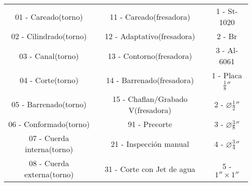 		\begin{center}
			\begin{tabular}{|c|c|c|}
				01 - Careado(torno)        & 11 - Careado(fresadora)           & 1 - St-1020\\
				02 - Cilindrado(torno)     & 12 - Adaptativo(fresadora)        & 2 - Br \\
				03 - Canal(torno)          & 13 - Contorno(fresadora)          & 3 - Al-6061\\
				04 - Corte(torno)          & 14 - Barrenado(fresadora)         & 1 - Placa $\frac{1}{8}''$ \\
				05 - Barrenado(torno)      & 15 - Chaflan/Grabado V(fresadora) & 2 - $\diameter \frac{1}{2}''$ \\
				06 - Conformado(torno)     & 91 - Precorte                     & 3 - $\diameter \frac{3}{8}''$ \\
				07 - Cuerda interna(torno) & 21 - Inspección manual            & 4 - $\diameter \frac{3}{4}''$ \\
				08 - Cuerda externa(torno) & 31 - Corte con Jet de agua        & 5 - $1'' \times 1''$ 
			\end{tabular}
		\end{center}

